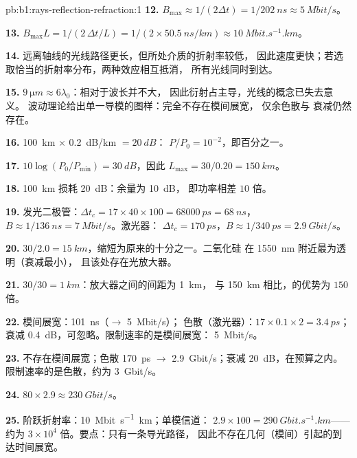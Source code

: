 \begin{solution}{pb:b1:rays-reflection-refraction:1}
\textbf{12.} $B_{\max} \approx 1/(2\Delta t) = 1/\qty{202}{ns} \approx
\qty{5}{Mbit/s}$。

\textbf{13.} $B_{\max} L = 1/(2\,\Delta t/L) = 1/(2 \times
\qty{50.5}{ns/km}) \approx \qty{10}{Mbit.s^{-1}.km}$。

\textbf{14.} 远离轴线的光线路径更长，但所处介质的折射率较低，
因此速度更快；若选取恰当的折射率分布，两种效应相互抵消，
所有光线同时到达。

\textbf{15.} $\qty{9}{\micro m} \approx 6\lambda_0$：相对于波长并不大，
因此衍射占主导，光线的概念已失去意义。
波动理论给出单一导模的图样：完全不存在模间展宽，
仅余色散与
衰减仍然存在。

\textbf{16.} \qty{100}{km} $\times$ \qty{0.2}{dB/km} $= \qty{20}{dB}$：
$P/P_0 = 10^{-2}$，即百分之一。

\textbf{17.} $10\log(P_0/P_{\min}) = \qty{30}{dB}$，因此 $L_{\max} =
30/0.20 = \qty{150}{km}$。

\textbf{18.} \qty{100}{km} 损耗 \qty{20}{dB}：余量为 \qty{10}{dB}，
即功率相差 $10$ 倍。

\textbf{19.} 发光二极管：$\Delta t_c = 17 \times 40 \times 100 = \qty{68000}{ps}
= \qty{68}{ns}$，$B \approx 1/\qty{136}{ns} = \qty{7}{Mbit/s}$。激光器：
$\Delta t_c = \qty{170}{ps}$，$B \approx 1/\qty{340}{ps} =
\qty{2.9}{Gbit/s}$。

\textbf{20.} $30/2.0 = \qty{15}{km}$，缩短为原来的十分之一。二氧化硅
在 \qty{1550}{nm} 附近最为透明（衰减最小），
且该处存在光放大器。

\textbf{21.} $30/30 = \qty{1}{km}$：放大器之间的间距为 \qty{1}{km}，
与 \qty{150}{km} 相比，的优势为 $150$ 倍。

\textbf{22.} 模间展宽：\qty{101}{ns}（$\to$ \qty{5}{Mbit/s}）；
色散（激光器）：$17 \times 0.1 \times 2 = \qty{3.4}{ps}$；
衰减 \qty{0.4}{dB}，可忽略。限制速率的是模间展宽：
\qty{5}{Mbit/s}。

\textbf{23.} 不存在模间展宽；色散 \qty{170}{ps} $\to$
\qty{2.9}{Gbit/s}；衰减 \qty{20}{dB}，在预算之内。
限制速率的是色散，约为 \qty{3}{Gbit/s}。

\textbf{24.} $80 \times 2.9 \approx \qty{230}{Gbit/s}$。

\textbf{25.} 阶跃折射率：\qty{10}{Mbit.s^{-1}.km}；单模信道：
$2.9 \times 100 = \qty{290}{Gbit.s^{-1}.km}$——约为
$3\times10^4$ 倍。要点：只有一条导光路径，
因此不存在几何（模间）引起的到达时间展宽。
\end{solution}
